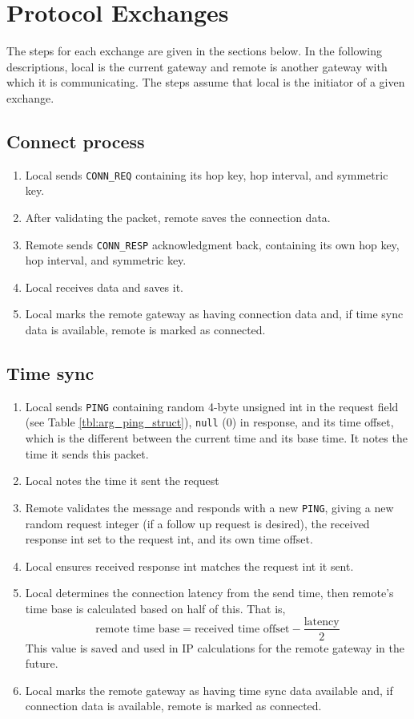 \section{Protocol Exchanges}
\label{sec:arg_protocol_exchanges}
\par The steps for each exchange are given in the sections below. In the following descriptions, local is the current gateway and remote is another gateway with which it is communicating. The steps assume that local is the initiator of a given exchange.

\subsection{Connect process}
\begin{enumerate}
	\item Local sends \texttt{CONN\_REQ} containing its hop key, hop interval, and symmetric key. 
	\item After validating the packet, remote saves the connection data.
	\item Remote sends \texttt{CONN\_RESP} acknowledgment back, containing its own hop key, hop interval, and symmetric key. 
	\item Local receives data and saves it.
	\item Local marks the remote gateway as having connection data and, if time sync data is available, remote is marked as connected. 
\end{enumerate}

\subsection{Time sync}
\label{sec:arg_time_sync}
\begin{enumerate}
	\item Local sends \texttt{PING} containing random 4-byte unsigned int in the request field (see Table \ref{tbl:arg_ping_struct}), \texttt{null} (0) in response, and its time offset, which is the different between the current time and its base time. It notes the time it sends this packet. 
	\item Local notes the time it sent the request
	\item Remote validates the message and responds with a new \texttt{PING}, giving a new random request integer (if a follow up request is desired), the received response int set to the request int, and its own time offset.
	\item Local ensures received response int matches the request int it sent.
	\item Local determines the connection latency from the send time, then remote's time base is calculated based on half of this. That is,
	$$\text{remote time base} = \text{received time offset} - \frac{\text{latency}}{2}$$
	This value is saved and used in \ac{IP} calculations for the remote gateway in the future.

	\item Local marks the remote gateway as having time sync data available and, if connection data is available, remote is marked as connected. 
\end{enumerate}

